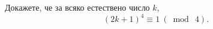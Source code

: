 

\begin{problem}
  Докажете, че за всяко естествено число $k$,
  \[(2k+1)^4 \equiv 1\ (\bmod\ 4).\]
\end{problem}

